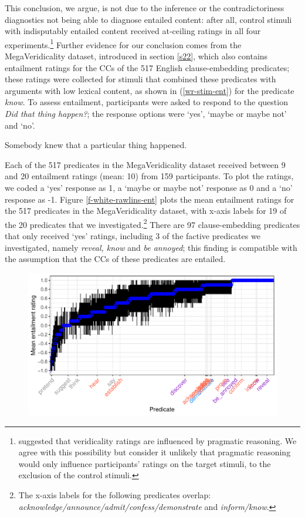 \documentclass[11pt,fleqn]{article}
\newcommand{\6}{\mbox{$[\hspace*{-.6mm}[$}}
\newcommand{\9}{\mbox{$]\hspace*{-.6mm}]$}}
\begin{document}
{This conclusion, we argue, is not due to the inference or the contradictoriness diagnostics not being able to diagnose entailed content: after all, control stimuli with indisputably entailed content received at-ceiling ratings in all four experiments.\footnote{\citet[329]{demarneffe-etal2012} suggested that veridicality ratings are influenced by pragmatic reasoning. We agree with this possibility but consider it unlikely that pragmatic reasoning would only influence participants' ratings on the target stimuli, to the exclusion of the control stimuli.} Further evidence for our conclusion comes from the MegaVeridicality dataset, introduced in section \ref{s22}, which also contains entailment ratings for the CCs of the 517 English clause-embedding predicates; these ratings were collected for stimuli that combined these predicates with arguments with low lexical content, as shown in (\ref{wr-stim-ent}) for the predicate {\em know}. To assess entailment, participants were asked to respond to the question {\em Did that thing happen?}; the response options were `yes', `maybe or maybe not' and `no'. 

\begin{exe}
\ex\label{wr-stim-ent} Somebody knew that a particular thing happened.
\end{exe}

Each of the 517 predicates in the MegaVeridicality dataset received between 9 and 20 entailment ratings (mean: 10) from 159 participants. To plot the ratings, we coded a `yes' response as 1, a `maybe or maybe not' response as 0 and a `no' response as -1. Figure \ref{f-white-rawlins-ent} plots the mean entailment ratings for the 517 predicates in the MegaVeridicality dataset, with x-axis labels for 19 of the 20 predicates that we investigated.\footnote{The x-axis labels for the following predicates overlap: {\em acknowledge/announce/admit/confess/demonstrate} and {\em inform/know}.} There are 97 clause-embedding predicates that only received `yes' ratings, including 3 of the factive predicates we investigated, namely {\em reveal, know} and {\em be annoyed}; this finding is compatible with the assumption that the CCs of these predicates are entailed. 

\begin{figure}[H]
\centering
\includegraphics[width=.75\paperwidth]{../../white-rawlins-data/graphs/means-entailment-by-predicate}


\end{figure}}
\end{document}
